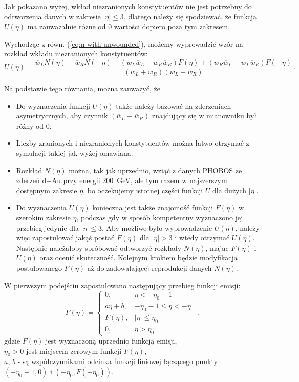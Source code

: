 \documentclass[a4paper,12pt]{article}
\begin{document}
Jak pokazano wyżej, wkład niezranionych konstytuentów nie jest potrzebny do odtworzenia danych w zakresie $|\eta| \le 3$, dlatego należy się spodziewać, że funkcja $U(\eta)$ ma zauważalnie różne od 0 wartości dopiero poza tym zakresem.

Wychodząc z równ. (\ref{eq:n-with-unwounded}), możemy wyprowadzić wzór na rozkład wkładu niezranionych konstytuentów:
\begin{equation} \label{eq:unqound-fun}
U(\eta) = \frac{\overline{w}_L N(\eta) - \overline{w}_R N(-\eta) - (w_L \overline{w}_L - w_R \overline{w}_R)F(\eta) + (w_R \overline{w}_L - w_L \overline{w}_R)F(-\eta)}{(\overline{w}_L + \overline{w}_R)(\overline{w}_L - \overline{w}_R)}\,.
\end{equation}

Na podstawie tego równania, można zauważyć, że
\begin{itemize}
	\item Do wyznaczenia funkcji $U(\eta)$ także należy bazować na zderzeniach asymetrycznych, aby czynnik $(\overline{w}_L - \overline{w}_R)$ znajdujący się w mianowniku był różny od 0.
	\item Liczby zranionych i niezranionych konstytuentów można łatwo otrzymać z symulacji takiej jak wyżej omawiana.
	\item Rozkład $N(\eta)$ można, tak jak uprzednio, wziąć z danych PHOBOS ze zderzeń d+Au przy energii 200~GeV, ale tym razem w najszerszym dostępnym zakresie $\eta$, bo oczekujemy istotnej części funkcji $U$ dla dużych $|\eta|$.
	\item Do wyznaczenia $U(\eta)$ konieczna jest także znajomość funkcji $F(\eta)$ w szerokim zakresie $\eta$, podczas gdy w sposób kompetentny wyznaczono jej przebieg jedynie dla $|\eta| \le 3$. Aby możliwe było wyprowadzenie $U(\eta)$, należy więc zapostulować jakąś postać $F(\eta)$ dla $|\eta| > 3$ i wtedy otrzymać $U(\eta)$. Następnie należałoby spróbować odtworzyć rozkłady $N(\eta)$, mając $F(\eta)$ i $U(\eta)$ oraz ocenić skuteczność. Kolejnym krokiem będzie modyfikacja postulowanego $F(\eta)$ aż do zadowalającej reprodukcji danych $N(\eta)$.
\end{itemize}

W pierwszym podejściu zapostulowano następujący przebieg funkcji emisji:
\begin{equation}
\widetilde{F}(\eta) = 
	\begin{cases} 
		0, &\eta < -\eta_0 - 1 \\
		a\eta + b, &-\eta_0 - 1 \le \eta < -\eta_0 \\
		F(\eta), &|\eta| \le \eta_0 \\
		0, &\eta > \eta_0
	\end{cases}\,,
\end{equation}
gdzie $F(\eta)$ jest wyznaczoną uprzednio funkcją emisji,\\
$\eta_0 > 0 $ jest miejscem zerowym funkcji $F(\eta)$, \\
$a$, $b$ - są współczynnikami odcinka funkcji liniowej łączącego punkty $(-\eta_0 - 1, 0)$ i $(-\eta_0, F(-\eta_0))$.
\end{document}
